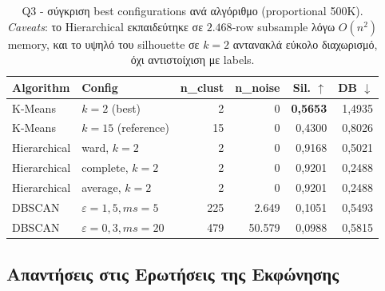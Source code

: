 \documentclass[12pt,a4paper,twoside]{book}
\begin{document}
\begin{table}[H]
    \centering
    \small
    \begin{tabular}{llrrrr}
        \toprule
        \textbf{Algorithm} & \textbf{Config} & \textbf{n\_clust} &
        \textbf{n\_noise} & \textbf{Sil. \(\uparrow\)} &
        \textbf{DB \(\downarrow\)} \\
        \midrule
        K-Means      & \textbf{\(k=2\)} (best)           & 2  & 0      & \textbf{0{,}5653} & 1{,}4935 \\
        K-Means      & \(k=15\) (reference)              & 15 & 0      & 0{,}4300 & 0{,}8026 \\
        Hierarchical & ward, \(k=2\)                     & 2  & 0      & 0{,}9168 & 0{,}5021 \\
        Hierarchical & complete, \(k=2\)                 & 2  & 0      & 0{,}9201 & 0{,}2488 \\
        Hierarchical & average, \(k=2\)                  & 2  & 0      & 0{,}9201 & 0{,}2488 \\
        DBSCAN       & \(\varepsilon=1{,}5, ms=5\)       & 225 & 2.649 & 0{,}1051 & 0{,}5493 \\
        DBSCAN       & \(\varepsilon=0{,}3, ms=20\)      & 479 & 50.579 & 0{,}0988 & 0{,}5815 \\
        \bottomrule
    \end{tabular}
    \caption{Q3 - σύγκριση best configurations ανά αλγόριθμο (proportional
    500K). \emph{Caveats}: το Hierarchical εκπαιδεύτηκε σε \(2.468\)-row
    subsample λόγω \(O(n^2)\) memory, και το υψηλό του silhouette σε \(k=2\)
    αντανακλά εύκολο διαχωρισμό, όχι αντιστοίχιση με labels.}
    \label{tab:q3_comparison}
\end{table}

\subsection{Απαντήσεις στις Ερωτήσεις της Εκφώνησης}
\end{document}
